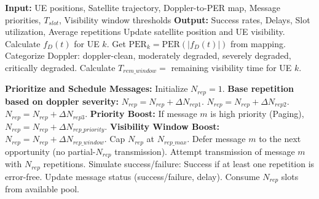 \documentclass[conference]{IEEEtran}
\begin{document}
\begin{algorithm}
    \caption{Doppler-Aware Adaptive Repetition Scheduling (DAARS)}
    \label{alg:daars}
    \begin{algorithmic}[1]
        \State \textbf{Input:} UE positions, Satellite trajectory, Doppler-to-PER map, Message priorities, $T_{slot}$, Visibility window thresholds
        \State \textbf{Output:} Success rates, Delays, Slot utilization, Average repetitions
            \State Update satellite position and UE visibility.
                \State Calculate $f_D(t)$ for UE $k$.
                \State Get $\text{PER}_{k} = \text{PER}(|f_D(t)|)$ from mapping.
                \State Categorize Doppler: doppler-clean, moderately degraded, severely degraded, critically degraded.
                \State Calculate $T_{rem\_window} =$ remaining visibility time for UE $k$.
            \EndFor

            \State \textbf{Prioritize and Schedule Messages:}
                    \State Initialize $N_{rep} = 1$.
                    \State \textbf{Base repetition based on doppler severity:}
                     $N_{rep} = N_{rep} + \Delta N_{rep1}$.
                     $N_{rep} = N_{rep} + \Delta N_{rep2}$.
                     $N_{rep} = N_{rep} + \Delta N_{rep3}$.
                    \EndIf
                    \State \textbf{Priority Boost:} If message $m$ is high priority (Paging), $N_{rep} = N_{rep} + \Delta N_{rep\_priority}$.
                    \State \textbf{Visibility Window Boost:}
                        $N_{rep} = N_{rep} + \Delta N_{rep\_window}$.
                    \EndIf
                    \State Cap $N_{rep}$ at $N_{rep\_max}$.
                        \State Defer message $m$ to the next opportunity (no partial-$N_{rep}$ transmission).
                    \Else
                        \State Attempt transmission of message $m$ with $N_{rep}$ repetitions.
                        \State Simulate success/failure: Success if at least one repetition is error-free.
                        \State Update message status (success/failure, delay).
                        \State Consume $N_{rep}$ slots from available pool.
                    \EndIf
                \EndIf
            \EndFor
        \EndFor
    \end{algorithmic}
\end{algorithm}
\end{document}
